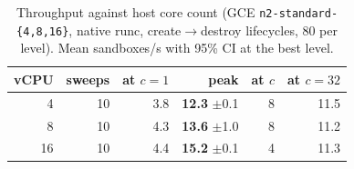 \begin{table}[t]
\centering
\caption{Throughput against host core count (GCE \texttt{n2-standard-\{4,8,16\}}, native runc, create$\rightarrow$destroy lifecycles, 80 per level). Mean sandboxes/s with 95\% CI at the best level.}
\label{tab:scaling}
\footnotesize
\begin{tabular}{@{}rrrrrr@{}}
\toprule
vCPU & sweeps & at $c{=}1$ & peak & at $c$ & at $c{=}32$ \\
\midrule
4 & 10 & 3.8 & \textbf{12.3} $\pm$0.1 & 8 & 11.5 \\
8 & 10 & 4.3 & \textbf{13.6} $\pm$1.0 & 8 & 11.2 \\
16 & 10 & 4.4 & \textbf{15.2} $\pm$0.1 & 4 & 11.3 \\
\bottomrule
\end{tabular}
\end{table}
